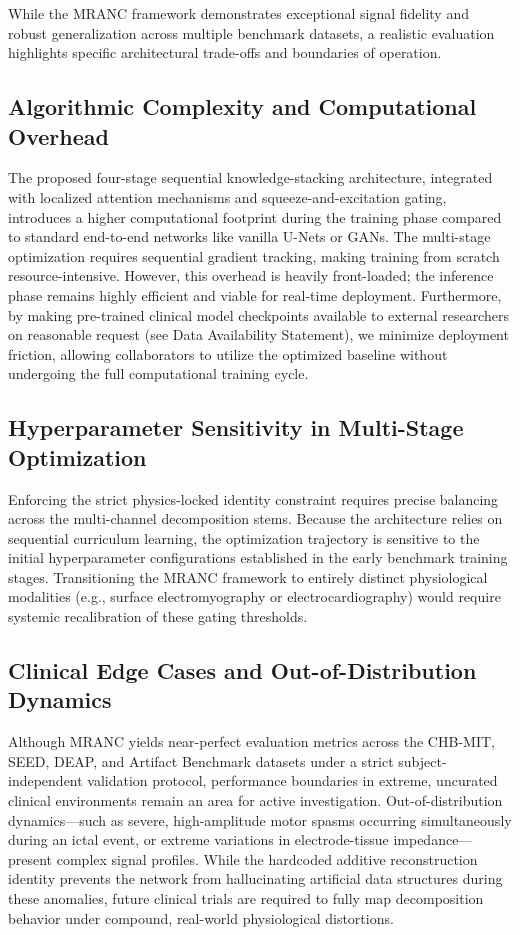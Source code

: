 \documentclass[journal,twocolumn]{IEEEtran}
\begin{document}
While the MRANC framework demonstrates exceptional signal fidelity and robust generalization across multiple benchmark datasets, a realistic evaluation highlights specific architectural trade-offs and boundaries of operation.

\subsection{Algorithmic Complexity and Computational Overhead}
The proposed four-stage sequential knowledge-stacking architecture, integrated with localized attention mechanisms and squeeze-and-excitation gating, introduces a higher computational footprint during the training phase compared to standard end-to-end networks like vanilla U-Nets or GANs. The multi-stage optimization requires sequential gradient tracking, making training from scratch resource-intensive. However, this overhead is heavily front-loaded; the inference phase remains highly efficient and viable for real-time deployment. Furthermore, by making pre-trained clinical model checkpoints available to external researchers on reasonable request (see Data Availability Statement), we minimize deployment friction, allowing collaborators to utilize the optimized baseline without undergoing the full computational training cycle.

\subsection{Hyperparameter Sensitivity in Multi-Stage Optimization}
Enforcing the strict physics-locked identity constraint requires precise balancing across the multi-channel decomposition stems. Because the architecture relies on sequential curriculum learning, the optimization trajectory is sensitive to the initial hyperparameter configurations established in the early benchmark training stages. Transitioning the MRANC framework to entirely distinct physiological modalities (e.g., surface electromyography or electrocardiography) would require systemic recalibration of these gating thresholds.

\subsection{Clinical Edge Cases and Out-of-Distribution Dynamics}
Although MRANC yields near-perfect evaluation metrics across the CHB-MIT, SEED, DEAP, and Artifact Benchmark datasets under a strict subject-independent validation protocol, performance boundaries in extreme, uncurated clinical environments remain an area for active investigation. Out-of-distribution dynamics---such as severe, high-amplitude motor spasms occurring simultaneously during an ictal event, or extreme variations in electrode-tissue impedance---present complex signal profiles. While the hardcoded additive reconstruction identity prevents the network from hallucinating artificial data structures during these anomalies, future clinical trials are required to fully map decomposition behavior under compound, real-world physiological distortions.
\end{document}
